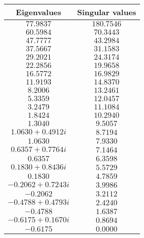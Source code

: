 \documentclass{article}
\begin{document}
\begin{tabular}{cc}
    Eigenvalues&Singular values\\
     \hline
         $77.9837$&$180.7546$\\
         $60.5984$&$70.3443$\\
         $47.7777$&$43.2984$\\
         $37.5667$&$31.1583$\\
         $29.2021$&$24.3174$\\
         $22.2856$&$19.9658$\\
         $16.5772$&$16.9829$\\
         $11.9193$&$14.8370$\\
         $8.2006$&$13.2461$\\
         $5.3359$&$12.0457$\\
         $3.2479$&$11.1084$\\
         $1.8424$&$10.2940$\\
         $1.3040$&$9.5057$\\
         $1.0630+0.4912i$&$8.7194$\\
         $1.0630$&$7.9330$\\
         $0.6357+0.7764i$&$7.1464$\\
         $0.6357$&$6.3598$\\
         $0.1830+0.8436i$&$5.5729$\\
         $0.1830$&$4.7859$\\
         $-0.2062+0.7243i$&$3.9986$\\
         $-0.2062$&$3.2112$\\
         $-0.4788+0.4793i$&$2.4240$\\
         $-0.4788$&$1.6387$\\
         $-0.6175+0.1670i$&$0.8694$\\
         $-0.6175$&$0.0000$\\
 \end{tabular}
\end{document}
